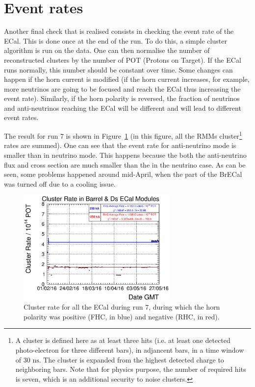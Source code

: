 \section{Event rates}
\label{sec:eventrate}
Another final check that is realised consists in checking the event
rate of the \Gls{ECal}.  This is done once at the end of the run. To
do this, a simple cluster algorithm is run on the data. One can then
normalise the number of reconstructed clusters by the number of
\Gls{POT} (Protons on Target). If the \Gls{ECal} runs normally, this
number should be constant over time. Some changes can happen if the
horn current is modified (if the horn current increases, for example,
more neutrinos are going to be focused and reach the \Gls{ECal} thus
increasing the event rate). Similarly, if the horn polarity is
reversed, the fraction of neutrinos and anti-neutrinos reaching the
\Gls{ECal} will be different and will lead to different event
rates.

The result for run 7 is shown in Figure~\ref{fig:eventrate} (in this
figure, all the \Glspl{RMM} cluster\footnote{A cluster is defined here
  as at least three hits (i.e. at least one detected photo-electron
  for three different bars), in adjancent bars, in a time window of
  $30\text{~ns}$. The cluster is expanded from the highest detected
  charge to neighboring bars. Note that for physics purpose, the
  number of required hits is seven, which is an additional security to
  noise clusters.} rates are summed). One can see that the event rate
for anti-neutrino mode is smaller than in neutrino mode. This happens
because the both the anti-neutrino flux and cross section are much
smaller than the in the neutrino case. As can be seen, some problems
happened around mid-April, when the part of the \Gls{BrECal} was
turned off due to a cooling issue.

\begin{figure}[ht]
  \begin{adjustbox}{center}
    \includegraphics[width=0.7\textwidth]{images/DataQuality/ClusterRates.eps} 
  \end{adjustbox}
  \caption[Run 7 ECal cluster rate]{Cluster rate for all the
    \Gls{ECal} during run 7, during which the horn polarity was
    positive (\Gls{FHC}, in blue) and negative (\Gls{RHC}, in red).}
  \label{fig:eventrate}
\end{figure}


